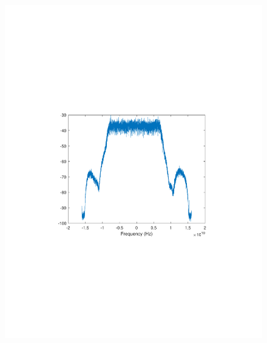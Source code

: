 \begin{refsection}
\begin{figure}[H]
	\centering
	\begin{minipage}{0.30\textwidth}
		\centering
		\includegraphics[clip, trim=4cm 8cm 4cm 8cm, width=1\textwidth]{./sdf/m_qam_system/figures/expResults/intradyne/3_16GBdInSig13dB_AfMIMO1.pdf}
		\label{fig:16GBdEyeMIMO1}
	\end{minipage}
	\begin{minipage}{0.30\textwidth}
		\centering

\end{minipage}
\end{figure}
\end{refsection}
